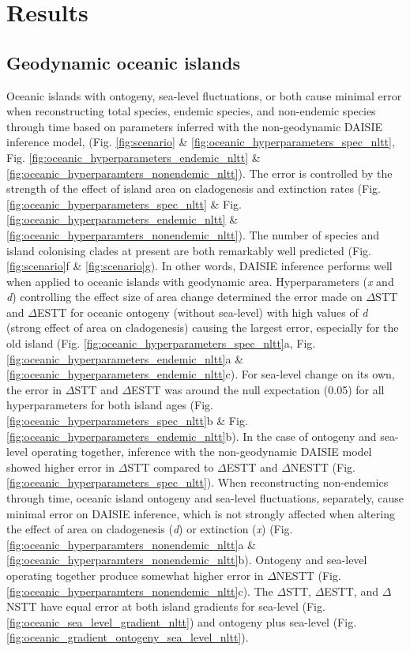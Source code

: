 \documentclass{article}
\begin{document}
\clearpage

\section*{Results}

\subsection*{Geodynamic oceanic islands}

Oceanic islands with ontogeny, sea-level fluctuations, or both cause minimal error when reconstructing total species, endemic species, and non-endemic species through time based on parameters inferred with the non-geodynamic DAISIE inference model, (Fig. \ref{fig:scenario} \& \ref{fig:oceanic_hyperparameters_spec_nltt}, Fig. \ref{fig:oceanic_hyperparameters_endemic_nltt} \& \ref{fig:oceanic_hyperparamters_nonendemic_nltt}). The error is controlled by the strength of the effect of island area on cladogenesis and extinction rates (Fig. \ref{fig:oceanic_hyperparameters_spec_nltt} \& Fig. \ref{fig:oceanic_hyperparameters_endemic_nltt} \& \ref{fig:oceanic_hyperparamters_nonendemic_nltt}). The number of species and island colonising clades at present are both remarkably well predicted (Fig. \ref{fig:scenario}f \& \ref{fig:scenario}g). In other words, DAISIE inference performs well when applied to oceanic islands with geodynamic area. Hyperparameters (\textit{x} and \textit{d}) controlling the effect size of area change determined the error made on $\Delta$STT and $\Delta$ESTT for oceanic ontogeny (without sea-level) with high values of \textit{d} (strong effect of area on cladogenesis) causing the largest error, especially for the old island (Fig. \ref{fig:oceanic_hyperparameters_spec_nltt}a, Fig. \ref{fig:oceanic_hyperparameters_endemic_nltt}a \& \ref{fig:oceanic_hyperparameters_endemic_nltt}c). For sea-level change on its own, the error in $\Delta$STT and $\Delta$ESTT was around the null expectation (0.05) for all hyperparameters for both island ages (Fig. \ref{fig:oceanic_hyperparameters_spec_nltt}b \& Fig. \ref{fig:oceanic_hyperparameters_endemic_nltt}b). In the case of ontogeny and sea-level operating together, inference with the non-geodynamic DAISIE model showed higher error in $\Delta$STT compared to $\Delta$ESTT and $\Delta$NESTT (Fig. \ref{fig:oceanic_hyperparameters_spec_nltt}). When reconstructing non-endemics through time, oceanic island ontogeny and sea-level fluctuations, separately, cause minimal error on DAISIE inference, which is not strongly affected when altering the effect of area on cladogenesis (\textit{d}) or extinction (\textit{x}) (Fig. \ref{fig:oceanic_hyperparamters_nonendemic_nltt}a \& \ref{fig:oceanic_hyperparamters_nonendemic_nltt}b). Ontogeny and sea-level operating together produce somewhat higher error in $\Delta$NESTT (Fig. \ref{fig:oceanic_hyperparamters_nonendemic_nltt}c). The $\Delta$STT, $\Delta$ESTT, and $\Delta$NSTT have equal error at both island gradients for sea-level (Fig. \ref{fig:oceanic_sea_level_gradient_nltt}) and ontogeny plus sea-level (Fig. \ref{fig:oceanic_gradient_ontogeny_sea_level_nltt}). \\
\end{document}
